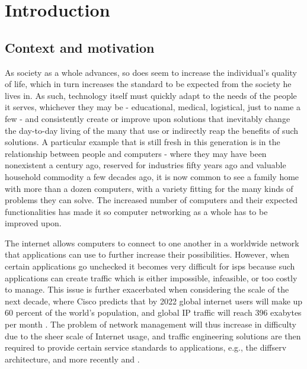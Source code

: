 \chapter{Introduction}

\section{Context and motivation}

    As society as a whole advances, so does seem to increase the individual's quality of life, which in turn increases the standard to be expected from the society he lives in.
    As such, technology itself must quickly adapt to the needs of the people it serves, whichever they may be - educational, medical, logistical, just to name a few - and consistently create or improve upon solutions that inevitably change the day-to-day living of the many that use or indirectly reap the benefits of such solutions.
    A particular example that is still fresh in this generation is in the relationship between people and computers - where they may have been nonexistent a century ago, reserved for industries fifty years ago and valuable household commodity a few decades ago, it is now common to see a family home with more than a dozen computers, with a variety fitting for the many kinds of problems they can solve.
    The increased number of computers and their expected functionalities has made it so computer networking as a whole has to be improved upon.

    The internet allows computers to connect to one another in a worldwide network that applications can use to further increase their possibilities.
    However, when certain applications go unchecked it becomes very difficult for \glspl{isp} because such applications can create traffic which is either impossible, infeasible, or too costly to manage.
    This issue is further exacerbated when considering the scale of the next decade, where Cisco predicts that by 2022 global internet users will make up 60 percent of the world's population, and global IP traffic will reach 396 exabytes per month \cite{cisco2019}.
    The problem of network management will thus increase in difficulty due to the sheer scale of Internet usage, and traffic engineering solutions are then required to provide certain service standards to applications, e.g., the \gls{diffserv} architecture, and more recently \cite{rev1} and \cite{rev2}.


